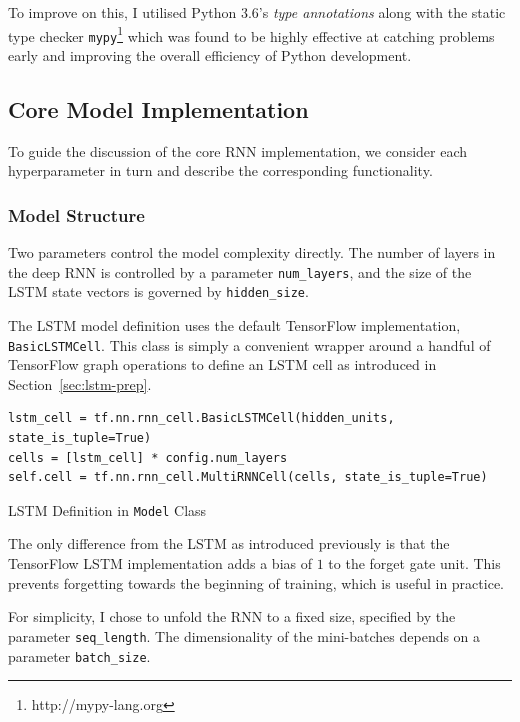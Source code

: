 \documentclass[12pt,a4paper,twoside,openright]{report}
\newcommand{\sref}[1]{Section~\ref{#1}}
\begin{document}
To improve on this, I utilised Python 3.6's \emph{type annotations} along with
the static type checker \texttt{mypy}\footnote{http://mypy-lang.org} which was
found to be highly effective at catching problems early and improving the
overall efficiency of Python development.

\subsection{Core Model Implementation}

To guide the discussion of the core RNN implementation, we consider each
hyperparameter in turn and describe the corresponding functionality.

\subsubsection{Model Structure}

Two parameters control the model complexity directly. The number of layers in
the deep RNN is controlled by a parameter \texttt{num\_layers}, and the size of
the LSTM state vectors is governed by \texttt{hidden\_size}.

The LSTM model definition uses the default TensorFlow implementation,
\texttt{BasicLSTMCell}. This class is simply a convenient wrapper around a
handful of TensorFlow graph operations to define an LSTM cell as introduced in
\sref{sec:lstm-prep}. 

\begin{listing}
  \begin{verbatim}
lstm_cell = tf.nn.rnn_cell.BasicLSTMCell(hidden_units, state_is_tuple=True)
cells = [lstm_cell] * config.num_layers
self.cell = tf.nn.rnn_cell.MultiRNNCell(cells, state_is_tuple=True)
  \end{verbatim}
  \caption{LSTM Definition in \texttt{Model} Class}
\end{listing}

The only difference from the LSTM as introduced previously is that the
TensorFlow LSTM implementation adds a bias of $1$ to the forget gate unit. This
prevents forgetting towards the beginning of training, which is useful in
practice.

For simplicity, I chose to unfold the RNN to a fixed size, specified by the
parameter \texttt{seq\_length}. The dimensionality of the mini-batches depends
on a parameter \texttt{batch\_size}.
\end{document}
